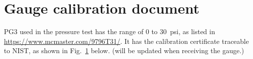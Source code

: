 \documentclass[letterpaper,11pt]{article}
\begin{document}
\section{Gauge calibration document}

PG3 used in the pressure test has the range of 0 to 30~psi, as listed in
\url{https://www.mcmaster.com/9796T31/}.
It has the calibration certificate traceable to NIST, as shown in Fig.~\ref{fig:PG3Certificate} below.
(will be updated when receiving the gauge.)


\begin{figure}[h]
    \centering
    \caption{}
    \label{fig:PG3Certificate}
\end{figure}


\end{document}
